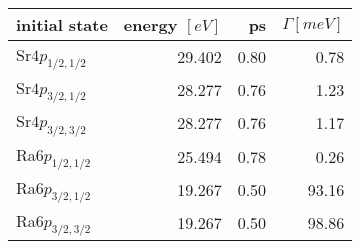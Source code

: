 \begin{table}[h]
 \centering
 \begin{tabular}{lrrr}
  \toprule
   initial state    & energy $[\unit{eV}]$ & ps & $\Gamma [\unit{meV}]$\\
  \midrule
   Sr$4p_{1/2,1/2}$ & 29.402 & 0.80 &   0.78\\
   Sr$4p_{3/2,1/2}$ & 28.277 & 0.76 &   1.23\\
   Sr$4p_{3/2,3/2}$ & 28.277 & 0.76 &   1.17\\
  \midrule
   Ra$6p_{1/2,1/2}$ & 25.494 & 0.78 &   0.26\\
   Ra$6p_{3/2,1/2}$ & 19.267 & 0.50 &  93.16 \\
   Ra$6p_{3/2,3/2}$ & 19.267 & 0.50 &  98.86\\
  \bottomrule
 \end{tabular}
 \caption{}
 \label{}
\end{table}
